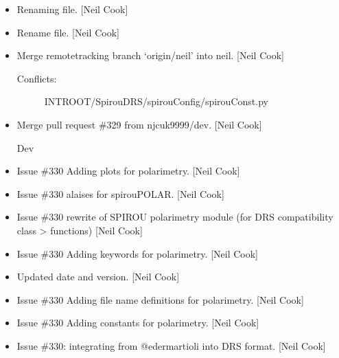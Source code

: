 \documentclass[a4paper,10pt,english]{report}
\begin{document}
\begin{itemize}
\item {} 
Renaming file. {[}Neil Cook{]}

\item {} 
Rename file. {[}Neil Cook{]}

\item {} 
Merge remote\sphinxhyphen{}tracking branch ‘origin/neil’ into neil. {[}Neil Cook{]}
\begin{description}
\item[{Conflicts:}] \leavevmode
INTROOT/SpirouDRS/spirouConfig/spirouConst.py

\end{description}

\item {} 
Merge pull request \#329 from njcuk9999/dev. {[}Neil Cook{]}

Dev

\item {} 
Issue \#330 \sphinxhyphen{} Adding plots for polarimetry. {[}Neil Cook{]}

\item {} 
Issue \#330 \sphinxhyphen{} alaises for spirouPOLAR. {[}Neil Cook{]}

\item {} 
Issue \#330 \sphinxhyphen{} re\sphinxhyphen{}write of SPIROU polarimetry module (for DRS
compatibility class \textendash{}\textgreater{} functions) {[}Neil Cook{]}

\item {} 
Issue \#330 \sphinxhyphen{} Adding keywords for polarimetry. {[}Neil Cook{]}

\item {} 
Updated date and version. {[}Neil Cook{]}

\item {} 
Issue \#330 \sphinxhyphen{} Adding file name definitions for polarimetry. {[}Neil Cook{]}

\item {} 
Issue \#330 \sphinxhyphen{} Adding constants for polarimetry. {[}Neil Cook{]}

\item {} 
Issue \#330: integrating  from @edermartioli into DRS format.
{[}Neil Cook{]}

\end{itemize}
\end{document}
